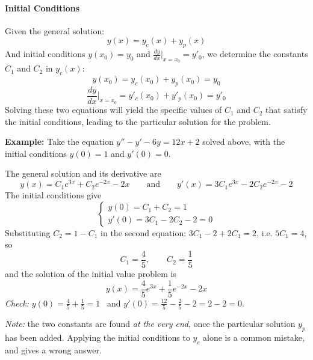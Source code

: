 \documentclass[]{article}
\begin{document}
	\paragraph{Initial Conditions}
	
	Given the general solution:
	$$
	y(x) = y_c(x) + y_p(x)
	$$
	And initial conditions $y(x_0) = y_0$ and $\frac{dy}{dx}\Big|_{x=x_0} = y'_0$, we determine the constants $C_1$ and $C_2$ in $y_c(x)$:
	$$
	y(x_0) = y_c(x_0) + y_p(x_0) = y_0
	$$
	$$
	\frac{dy}{dx}\Big|_{x=x_0} = y'_c(x_0) + y'_p(x_0) = y'_0
	$$
	Solving these two equations will yield the specific values of $C_1$ and $C_2$ that satisfy the initial conditions, leading to the particular solution for the problem.

	\noindent \textbf{Example:}
	Take the equation $y'' - y' - 6y = 12x + 2$ solved above, with the initial conditions $y(0) = 1$ and $y'(0) = 0$.

	The general solution and its derivative are
	$$
	y(x) = C_1 e^{3x} + C_2 e^{-2x} - 2x
	\qquad \text{and} \qquad
	y'(x) = 3C_1 e^{3x} - 2C_2 e^{-2x} - 2
	$$
	The initial conditions give
	$$
	\begin{cases}
		y(0) = C_1 + C_2 = 1 \\
		y'(0) = 3C_1 - 2C_2 - 2 = 0
	\end{cases}
	$$
	Substituting $C_2 = 1 - C_1$ in the second equation: $3C_1 - 2 + 2C_1 = 2$, i.e. $5C_1 = 4$, so
	$$
	C_1 = \frac{4}{5}, \qquad C_2 = \frac{1}{5}
	$$
	and the solution of the initial value problem is
	$$
	y(x) = \frac{4}{5} e^{3x} + \frac{1}{5} e^{-2x} - 2x
	$$
	\textit{Check:} $y(0) = \frac{4}{5} + \frac{1}{5} = 1$ \checkmark \ and $y'(0) = \frac{12}{5} - \frac{2}{5} - 2 = 2 - 2 = 0$. \checkmark

	\textit{Note:} the two constants are found \textit{at the very end}, once the particular solution $y_p$ has been added.
	Applying the initial conditions to $y_c$ alone is a common mistake, and gives a wrong answer.
	
	
\end{document}

